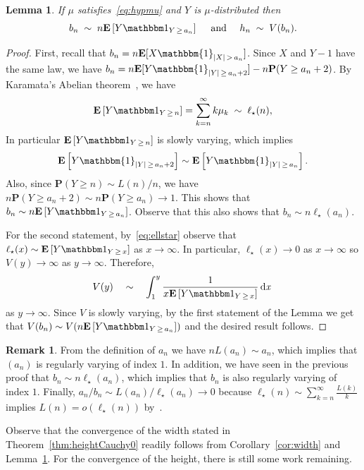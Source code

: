 \documentclass[10pt]{amsart}
\newtheorem{lemm}[theo]{Lemma}\newtheorem{prop}[theo]{Proposition}\newtheorem{coro}[theo]{Corollary}\newtheorem{conj}[theo]{Conjecture}
\theoremstyle{definition}\newtheorem{defi}[theo]{Definition}\newtheorem{rema}[theo]{Remark}\newtheorem{exam}[theo]{Example}\newtheorem{exem}[theo]{Example}\newtheorem{nota}[theo]{Notation}
\newcommand{\p}{\mathbf{P}}
\newcommand{\E}[1]{{\mathbf E}\left[#1\right]}
\newcommand{\bfE}{\mathbf{E}}
\DeclareMathOperator{\dxseq}{d\mathit{x}}
\newcommand{\I}[1]{{\mathbbm 1}_{#1}}
\begin{document}
\begin{lemm}\label{lem:equiv}
If $\mu$ satisfies~\eqref{eq:hypmu} and $Y$ is $\mu$-distributed then
\[
b_{n} \;\sim \; n \E{Y\I{Y\,\ge\,a_n}} \quad \text{ and }\quad h_{n} \; \sim \; V(b_{n}).
\]
\end{lemm}

\begin{proof}
First, recall that $b_{n}=n \bfE[X \mathbbm{1}_{|X|\,> \,a_{n}}]$. Since $X$ and $Y-1$ have the same law, we have $b_{n}=n \bfE[ Y\mathbbm{1}_{|Y|\,\geq\,a_{n}+2}]-n \p(Y \geq a_{n}+2)$. By Karamata's Abelian theorem~\cite[Theorem~8.1.6]{BGT89}, we have
\begin{equation}\label{eq:ellstar}
\E{Y \I{Y\,\ge\,n}} = \sum_{k=n}^{\infty} k \mu_k \; \sim \; \ell_{\star}(n),
\end{equation}
In particular $\E{Y \I{Y\,\ge\,n}}$ is slowly varying, which implies
\[
\E{ Y\mathbbm{1}_{|Y|\,\geq\,a_{n}+2}} \sim \E{ Y\mathbbm{1}_{|Y|\,\geq\,a_{n}}}.
\]
Also, since $\p(Y \geq n) \sim L(n)/n$, we have $n \p(Y \geq a_{n}+2) \sim n\p(Y \geq a_{n}) \rightarrow 1$. This shows that $ b_{n} \sim n \E{Y\I{Y \,\ge\,a_n}}$. Observe that this also shows that $b_{n} \sim n \ell_{\star}(a_{n})$.

For the second statement, by~\eqref{eq:ellstar} observe that $\ell_{\star}(x) \sim \E{Y \I{Y\,\ge\,x}}$ as $x \rightarrow \infty$. In particular, $\ell_\star(x)\to 0$ as $x\to\infty$ so $V(y)\to \infty$ as $y\to \infty$. Therefore,
\[
V(y) \quad \sim \quad \int_1^{y} \frac{1}{ x \E{Y \I{Y\, \ge\,x}}} \dxseq\,
\]
as $y \rightarrow \infty$. Since $V$ is slowly varying, by the first statement of the Lemma we get that $V(b_{n}) \sim V(n \E{Y\I{Y\,\ge\,a_n}})$ and the desired result follows.
\end{proof}


\begin{rema}\label{rk:anbn}
From the definition of $a_{n}$ we have $n L(a_{n}) \sim a_{n}$, which implies that $(a_{n})$ is regularly varying of index $1$. In addition, we have seen in the previous proof that $b_{n} \sim n \ell_{\star}(a_{n})$, which implies that $b_{n}$ is also regularly varying of index $1$. Finally, $a_{n}/b_{n} \sim L(a_{n})/\ell_{\star}(a_{n}) \rightarrow 0$ because $\ell_{\star}(n) \sim \sum_{k=n}^{\infty} \frac{L(k)}{k} $ implies $L(n)=o(\ell_{\star}(n))$ by~\cite[Proposition~1.5.9b]{BGT89}.
\end{rema}

Observe that the convergence of the width stated in Theorem~\ref{thm:heightCauchy0} readily follows from Corollary~\ref{cor:width} and Lemma~\ref{lem:equiv}. For the convergence of the height, there is still some work remaining.
\end{document}
